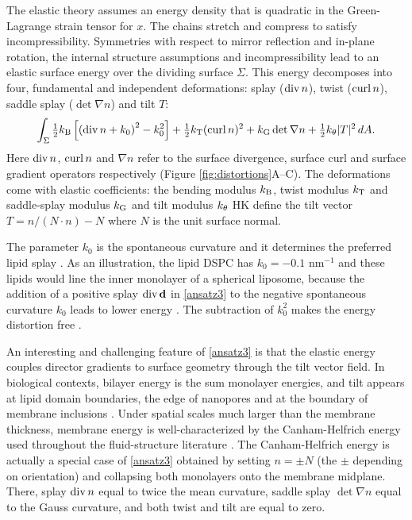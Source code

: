 The elastic theory assumes an energy density that is quadratic in the Green-Lagrange strain tensor for $x$. 
The chains stretch and compress to satisfy incompressibility.
Symmetries with respect to mirror reflection and in-plane rotation, the internal structure assumptions and incompressibility
lead to an elastic surface energy over the dividing surface $\Sigma$. 
This energy decomposes into four, fundamental and independent deformations:
splay ($\operatorname{div} n$), twist ($\operatorname{curl} n$), saddle splay ($\det \nabla n$) and tilt $T$:
\begin{equation}
\label{ansatz3}
\begin{aligned}
\int_{\Sigma} 
  \tfrac{1}{2}k_{\mathrm{B}}\left[ \left( \operatorname{div} n + k_0\right)^2 - k_0^2\right] 
+ \tfrac{1}{2}k_{\mathrm{T}} (\operatorname{curl} n)^2 + k_{\mathrm{G}}  \det \nabla n + \tfrac{1}{2}k_{\theta} |T|^2 \,dA.
\end{aligned}
\end{equation}
Here $\operatorname{div} n$, $\operatorname{curl} n$ and $\nabla n$ refer to the surface divergence, surface curl and surface gradient operators
respectively (Figure \ref{fig:distortions}A--C).
The deformations come with elastic coefficients: the bending modulus $k_{\mathrm{B}}$, twist modulus $k_{\mathrm{T}}$ 
and saddle-splay modulus $k_{\mathrm{G}}$ and tilt modulus $k_{\theta}$
HK define the tilt vector $T = n/(N\cdot n) - N$ where $N$ is the unit surface normal.

The parameter $k_0$ is the  spontaneous curvature and it determines the preferred lipid splay \cite{RoLi15,Kozlov2007}. 
As an illustration, the lipid DSPC has $k_0 = -0.1$ nm$^{-1}$ 
and these lipids would line the  inner monolayer of a 
spherical liposome, because the addition of a positive splay $\operatorname{div} \mathbf{d}$  in \eqref{ansatz3}
to the negative spontaneous curvature $k_0$ leads to lower energy \cite{Kamal22245, C3SM51829A, RoLi15,FriedSeguin15}.
The subtraction of $k_0^2$ makes the energy distortion free
\cite{Helfrich73,PhysRevLett.113.248102,Hamm2000}.

An interesting and challenging feature of \eqref{ansatz3} is that the
elastic energy couples director gradients to surface geometry through
the tilt vector field.  In biological contexts, bilayer energy is the
sum monolayer energies, and tilt appears at lipid domain boundaries, the
edge of nanopores and at the boundary of membrane inclusions
\cite{PhysRevE.102.042406}.  Under spatial scales much larger than the
membrane thickness, membrane energy is well-characterized by the
Canham-Helfrich energy used throughout the fluid-structure literature
\cite{QiangDu09, Lowengrub07,KimLai2010_JCP, Hu, HuLaiSeolEtAl2016_JCP,
qua-bir2014, qua-vee-you2019}.  The Canham-Helfrich energy is actually a special case of
\eqref{ansatz3} obtained by setting $n =  \pm N$ (the $\pm$ depending on
orientation) and collapsing both monolayers onto the membrane midplane.
There, splay $\operatorname{div} n$ equal to twice the mean curvature, saddle splay
$\det \nabla n$ equal to the Gauss curvature, and both twist and tilt
are equal to zero. 




